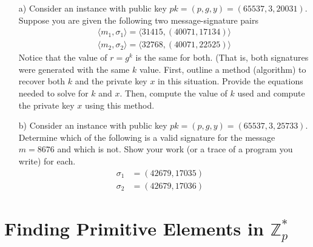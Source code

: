 \documentclass[12pt, letterpaper]{article}
\begin{document}
\begin{itemize}
\item[a)] Consider an instance with public key 
$pk = (p,g,y) = (65537, 3, {20031})$.
Suppose you are given the following two message-signature
pairs 
\begin{align*}
\langle m_1, \sigma_1 \rangle = \langle 31415, (40071, 17134)\rangle \\
\langle m_2, \sigma_2 \rangle = \langle 32768, (40071, 22525)\rangle
\end{align*}
Notice that the value of $r=g^k$ is the same for both.  (That is, both signatures were 
generated with the same $k$ value. First, outline a method (algorithm) to 
recover both $k$ and the private key $x$ in this situation. 
Provide the equations needed to solve for $k$ and $x$.  Then, 
compute the value of $k$ used and compute the private key $x$
using this method.  


\item[b)] Consider an instance with public key $pk = (p,g,y) = (65537, 3, 25733)$.  Determine which of the following is a valid signature for the message $m = 8676$ and which is not.  Show your work (or a trace of a program you write) for each.
\begin{align*}
\sigma_1 &= (42679, 17035) \quad \\ 
\sigma_2 &= (42679, 17036) \quad
\end{align*}


   

\end{itemize}


\section{Finding Primitive Elements in $\mathbb{Z}_p^*$}
\end{document}
